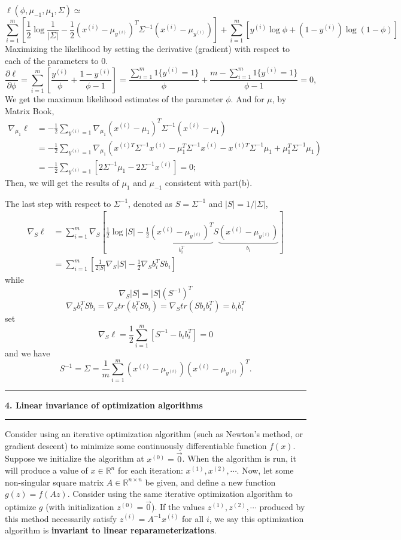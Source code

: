 \documentclass[11pt]{article}
\newcommand\question[2]{\vspace{.25in}\hrule\textbf{#1. #2}\vspace{.5em}\hrule\vspace{.10in}}
\begin{document}
$\ell(\phi, \mu_{-1}, \mu_{1}, \Sigma) \simeq$
$$ \sum_{i = 1}^{m}\left[\frac{1}{2}\log\frac{1}{|\Sigma|}-\frac{1}{2}(x^{(i)}-\mu_{y^{(i)}})^T\Sigma^{-1}(x^{(i)}-\mu_{y^{(i)}})\right]+\sum_{i = 1}^{m}\left[y^{(i)}\log\phi+(1-y^{(i)})\log(1-\phi)\right]$$
Maximizing the likelihood by setting the derivative (gradient) with respect to each of the parameters to 0.
$$\frac{\partial \ell}{\partial \phi} = \sum_{i=1}^{m}\left[\frac{y^{(i)}}{\phi}+\frac{1-y^{(i)}}{\phi-1}\right] = \frac{\sum_{i=1}^{m}1\{y^{(i)}=1\}}{\phi}+\frac{m - \sum_{i=1}^{m}1\{y^{(i)}=1\}}{\phi-1}=0,$$
We get the maximum likelihood estimates of the parameter $\phi$. And for $\mu$, by Matrix Book,
\begin{align*}
  \nabla_{\mu_1}\ell &  = -\frac{1}{2}\sum_{y^{(i)} =1} \nabla_{\mu_1}(x^{(i)}-\mu_{1})^T\Sigma^{-1}(x^{(i)}-\mu_{1})  \\
  ~ & = -\frac{1}{2}\sum_{y^{(i)} =1} \nabla_{\mu_1} \left(x^{(i)T}\Sigma^{-1}x^{(i)} - \mu_{1}^T\Sigma^{-1}x^{(i)} - x^{(i)T}\Sigma^{-1}\mu_{1}+\mu_{1}^T\Sigma^{-1}\mu_{1}\right) \\
  ~ & = -\frac{1}{2}\sum_{y^{(i)} =1}\left[2\Sigma^{-1}\mu_{1}-2\Sigma^{-1}x^{(i)}\right] = 0;
\end{align*}
Then, we will get the results of $\mu_{1}$ and $\mu_{-1}$ consistent with part(b).

The last step with respect to $\Sigma^{-1}$, denoted as $S = \Sigma^{-1}$ and $|S| = 1/|\Sigma|$,
\begin{align*}
  \nabla_{S}\ell &  = \sum_{i=1}^{m}\nabla_S\left[\frac{1}{2}\log|S|-\frac{1}{2}\underbrace{(x^{(i)}-\mu_{y^{(i)}})^T}_{b_i^T}S\underbrace{(x^{(i)}-\mu_{y^{(i)}})}_{b_i}\right]\\
~ & = \sum_{i=1}^{m}\left[\frac{1}{2|S|}\nabla_S|S|-\frac{1}{2}\nabla_Sb_i^TSb_i\right]
\end{align*}
while
$$\nabla_S|S| = |S|(S^{-1})^T$$
$$\nabla_Sb_i^TSb_i = \nabla_S tr(b_i^TSb_i)=\nabla_S tr(Sb_ib_i^T) = b_ib_i^T$$
set
$$\nabla_S\ell = \frac{1}{2}\sum_{i=1}^{m}\left[S^{-1}-b_ib_i^T\right] = 0$$
and we have $$S^{-1}=\Sigma = \frac{1}{m}\sum_{i=1}^{m}(x^{(i)}-\mu_{y^{(i)}})(x^{(i)}-\mu_{y^{(i)}})^T.$$

\question{4}{Linear invariance of optimization algorithms}
Consider using an iterative optimization algorithm (such as Newton's method, or gradient descent) to minimize some continuously differentiable function $f(x)$. Suppose we initialize the algorithm at $x^{(0)} = \overrightarrow{0}$. When the algorithm is run, it will produce a value of $x \in \mathbb{R}^n$ for each iteration: $x^{(1)}, x^{(2)}, \cdots$.
Now, let some non-singular square matrix $A \in \mathbb{R}^{n\times n}$ be given, and define a new function $g(z) = f(Az)$. Consider using the same iterative optimization algorithm to optimize $g$ (with
initialization $z^{(0)} = \overrightarrow{0}$). If the values $z^{(1)}, z^{(2)}, \cdots$ produced by this method necessarily satisfy $z^{(i)} = A^{-1}x^{(i)}$ for all $i$, we say this optimization algorithm is \textbf{invariant to linear reparameterizations}.
\end{document}
